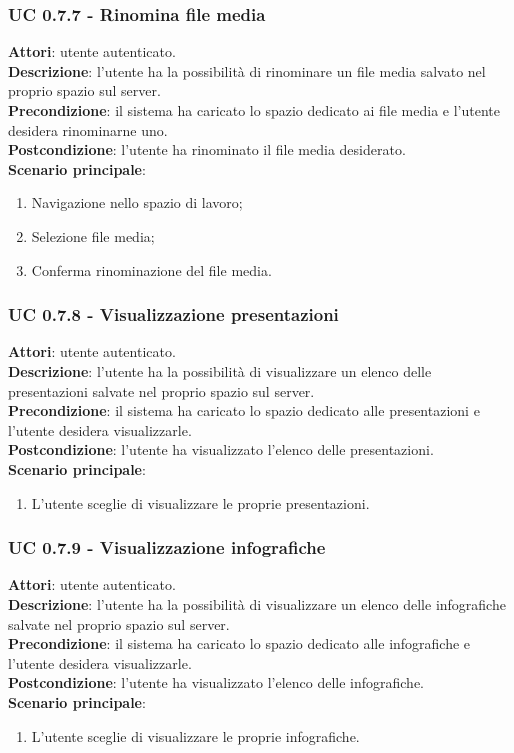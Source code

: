 	\subsubsection{UC 0.7.7 - Rinomina file media}{
		\label{uc0.7.7}
		\textbf{Attori}: utente autenticato.	\\
		\textbf{Descrizione}: l'utente ha la possibilità di rinominare un file media salvato nel proprio spazio sul server. \\
		\textbf{Precondizione}: il sistema ha caricato lo spazio dedicato ai file media e l'utente desidera rinominarne uno.	\\
		\textbf{Postcondizione}: l'utente ha rinominato il file media desiderato.	\\
		\textbf{Scenario principale}:
		\begin{enumerate}
			\item Navigazione nello spazio di lavoro;
			\item Selezione file media;
			\item Conferma rinominazione del file media.
		\end{enumerate}
		}
	\subsubsection{UC 0.7.8 - Visualizzazione presentazioni}{
		\label{uc0.7.8}
		\textbf{Attori}: utente autenticato.	\\
		\textbf{Descrizione}: l'utente ha la possibilità di visualizzare un elenco delle presentazioni salvate nel proprio spazio sul server. \\
		\textbf{Precondizione}: il sistema ha caricato lo spazio dedicato alle presentazioni e l'utente desidera visualizzarle.	\\
		\textbf{Postcondizione}: l'utente ha visualizzato l'elenco delle presentazioni.	\\
		\textbf{Scenario principale}:
		\begin{enumerate}
			\item L'utente sceglie di visualizzare le proprie presentazioni.
		\end{enumerate}
		}
	\subsubsection{UC 0.7.9 - Visualizzazione infografiche}{
		\label{uc0.7.9}
		\textbf{Attori}: utente autenticato.	\\
		\textbf{Descrizione}: l'utente ha la possibilità di visualizzare un elenco delle infografiche salvate nel proprio spazio sul server. \\
		\textbf{Precondizione}: il sistema ha caricato lo spazio dedicato alle infografiche e l'utente desidera visualizzarle.	\\
		\textbf{Postcondizione}: l'utente ha visualizzato l'elenco delle infografiche.	\\
		\textbf{Scenario principale}:
		\begin{enumerate}
			\item L'utente sceglie di visualizzare le proprie infografiche.
		\end{enumerate}
		}
